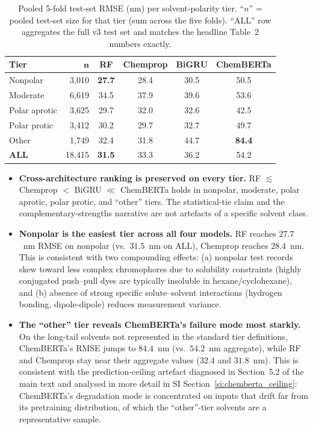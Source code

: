 \documentclass[journal=jcisd8,manuscript=suppinfo]{achemso}
\begin{document}
\begin{table}[htbp]
\centering
\caption{Pooled 5-fold test-set RMSE (nm) per solvent-polarity tier. ``$n$'' = pooled test-set size for that tier (sum across the five folds). ``ALL'' row aggregates the full v3 test set and matches the headline Table~2 numbers exactly.}
\label{tab:si_polarity_breakdown}
\small
\begin{tabular}{lrcccc}
\toprule
\textbf{Tier} & $\boldsymbol{n}$ & \textbf{RF} & \textbf{Chemprop} & \textbf{BiGRU} & \textbf{ChemBERTa} \\
\midrule
Nonpolar & 3{,}010 & \textbf{27.7} & 28.4 & 30.5 & 50.5 \\
Moderate & 6{,}619 & 34.5 & 37.9 & 39.6 & 53.6 \\
Polar aprotic & 3{,}625 & 29.7 & 32.0 & 32.6 & 42.5 \\
Polar protic & 3{,}412 & 30.2 & 29.7 & 32.7 & 49.7 \\
Other & 1{,}749 & 32.4 & 31.8 & 44.7 & \textbf{84.4} \\
\midrule
\textbf{ALL} & 18{,}415 & \textbf{31.5} & 33.3 & 36.2 & 54.2 \\
\bottomrule
\end{tabular}
\end{table}

\begin{itemize}[leftmargin=2em,itemsep=2pt]
 \item \textbf{Cross-architecture ranking is preserved on every tier.} RF $\lesssim$ Chemprop $<$ BiGRU $\ll$ ChemBERTa holds in nonpolar, moderate, polar aprotic, polar protic, and ``other'' tiers. The statistical-tie claim and the complementary-strengths narrative are not artefacts of a specific solvent class.
 \item \textbf{Nonpolar is the easiest tier across all four models.} RF reaches $27.7$~nm RMSE on nonpolar (vs.\ $31.5$~nm on ALL), Chemprop reaches $28.4$~nm. This is consistent with two compounding effects: (a) nonpolar test records skew toward less complex chromophores due to solubility constraints (highly conjugated push--pull dyes are typically insoluble in hexane/cyclohexane), and (b) absence of strong specific solute--solvent interactions (hydrogen bonding, dipole-dipole) reduces measurement variance.
 \item \textbf{The ``other'' tier reveals ChemBERTa's failure mode most starkly.} On the long-tail solvents not represented in the standard tier definitions, ChemBERTa's RMSE jumps to $84.4$~nm (vs.\ $54.2$~nm aggregate), while RF and Chemprop stay near their aggregate values ($32.4$ and $31.8$~nm). This is consistent with the prediction-ceiling artefact diagnosed in Section~5.2 of the main text and analysed in more detail in SI Section~\ref{si:chemberta_ceiling}: ChemBERTa's degradation mode is concentrated on inputs that drift far from its pretraining distribution, of which the ``other''-tier solvents are a representative sample.
\end{itemize}
\end{document}
